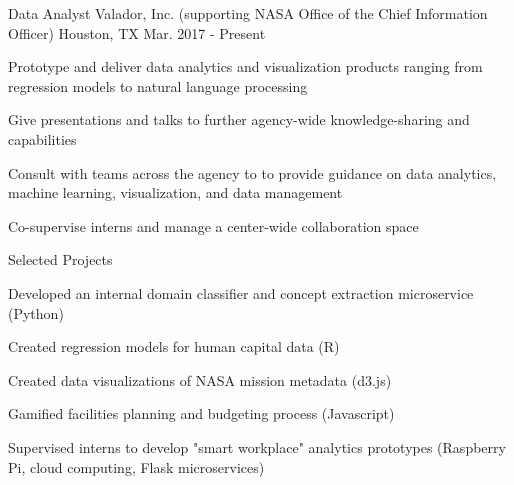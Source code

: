 

\begin{cventries}

  \cventry
    {Data Analyst} %
    {Valador, Inc. (supporting NASA Office of the Chief Information Officer)} %
    {Houston, TX} %
    {Mar. 2017 - Present} %
    {
      \begin{cvitems} %
        \item {Prototype and deliver data analytics and visualization products ranging from regression models to natural language processing}
        \item {Give presentations and talks to further agency-wide knowledge-sharing and capabilities}
        \item {Consult with teams across the agency to to provide guidance on data analytics, machine learning, visualization, and data management}
        \item {Co-supervise interns and manage a center-wide collaboration space}
      \end{cvitems}
    }
\cventry
  {Selected Projects}{}{}{}
  {
   \begin{cvitems}
    \item {Developed an internal domain classifier and concept extraction microservice (Python)}
    \item {Created regression models for human capital data (R)}
    \item {Created data visualizations of NASA mission metadata (d3.js)}
    \item {Gamified facilities planning and budgeting process (Javascript)}
    \item {Supervised interns to develop "smart workplace" analytics prototypes (Raspberry Pi, cloud computing, Flask microservices)}
   \end{cvitems}
  }
    

\end{cventries}
